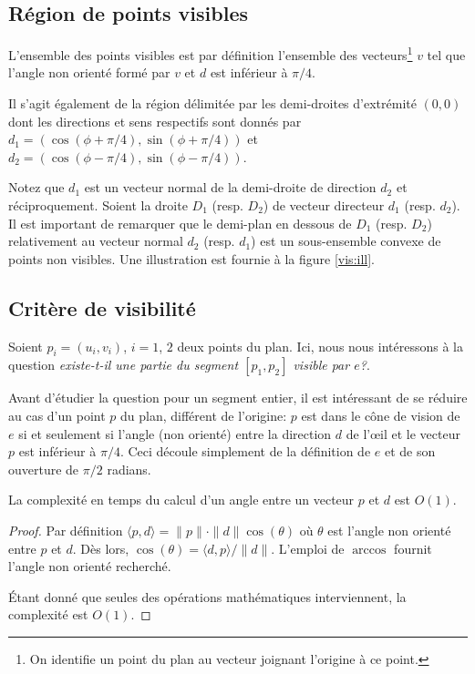 \subsection{Région de points visibles}
L'ensemble des points visibles est par définition l'ensemble
des vecteurs\footnote{On identifie un point du plan au vecteur
  joignant l'origine à ce point.} $v$ tel que l'angle non orienté formé
par $v$ et $d$ est inférieur à $\pi/4$.

Il s'agit également de la région délimitée par les demi-droites d'extrémité
$(0, 0)$ dont les directions et sens respectifs sont donnés par
$d_1 = (\cos(\phi + \pi/4), \sin(\phi + \pi/4))$ et
$d_2 = (\cos(\phi - \pi/4), \sin(\phi - \pi/4))$.

Notez que $d_1$ est un vecteur
normal de la demi-droite de direction $d_2$ et réciproquement.
Soient la droite $D_1$ (resp. $D_2$) de vecteur directeur $d_1$
(resp. $d_2$). Il est important de remarquer
que le demi-plan en dessous de $D_1$ (resp. $D_2$) relativement au vecteur
normal $d_2$ (resp. $d_1$) est un sous-ensemble convexe de points non visibles.
Une illustration est fournie à la figure \ref{vis:ill}.


\subsection{Critère de visibilité}
Soient $p_i=(u_i, v_i)$, $i = 1$, $2$ deux points du plan. Ici, nous nous
intéressons à la question \og\emph{existe-t-il une partie du segment $[p_1, p_2]$
  visible par $e$?}\fg.

Avant d'étudier la question pour un segment entier, il est intéressant de
se réduire au cas d'un point $p$ du plan, différent de l'origine:
$p$ est dans le cône de vision de $e$
si et seulement si l'angle (non orienté) entre la direction
$d$ de l'\oe{}il et le vecteur $p$
est inférieur
à $\pi/4$. Ceci découle simplement de la définition de $e$ et de son ouverture
de $\pi/2$ radians.

\begin{lem}
  La complexité en temps du calcul d'un angle entre un vecteur $p$ et $d$ est
  $O(1)$.
\end{lem}
\begin{proof}
  Par définition $\langle p, d\rangle = \|p\|\cdot \|d\| \cos(\theta)$ où $\theta$ est
  l'angle non orienté entre $p$ et $d$. Dès lors,
  $\cos(\theta) = \langle d, p\rangle/\|d\|$. L'emploi de $\arccos$ fournit
  l'angle non orienté recherché.

  \'Etant donné que seules des opérations mathématiques interviennent,
  la complexité est $O(1)$.
\end{proof}

